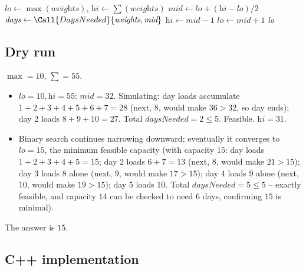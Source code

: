 \begin{algorithm}[H]
\caption{Minimum Capacity to Ship within D Days}
\begin{algorithmic}[1]
  \State $\textit{lo} \gets \max(\textit{weights})$, $\textit{hi} \gets \sum(\textit{weights})$
    \State $\textit{mid} \gets \textit{lo}+(\textit{hi}-\textit{lo})/2$
    \State $\textit{days} \gets \Call{DaysNeeded}{\textit{weights}, \textit{mid}}$
      \State $\textit{hi} \gets \textit{mid} - 1$
    \Else
      \State $\textit{lo} \gets \textit{mid} + 1$
    \EndIf
  \EndWhile
  \State \Return \textit{lo}
\EndProcedure
\end{algorithmic}
\end{algorithm}

\subsection*{Dry run}


$\max = 10$, $\sum = 55$.

\begin{itemize}
  \item $\textit{lo}=10,\textit{hi}=55$: $\textit{mid}=32$. Simulating: day
        loads accumulate $1{+}2{+}3{+}4{+}5{+}6{+}7=28$ (next, $8$, would
        make $36>32$, so day ends); day 2 loads $8{+}9{+}10=27$. Total
        $\textit{daysNeeded}=2 \le 5$. Feasible. $\textit{hi}=31$.
  \item Binary search continues narrowing downward; eventually it
        converges to $\textit{lo}=15$, the minimum feasible capacity (with
        capacity $15$: day loads $1{+}2{+}3{+}4{+}5=15$; day 2 loads
        $6{+}7=13$ (next, $8$, would make $21>15$); day 3 loads $8$ alone
        (next, $9$, would make $17>15$); day 4 loads $9$ alone (next,
        $10$, would make $19>15$); day 5 loads $10$. Total
        $\textit{daysNeeded}=5 \le 5$ -- exactly feasible, and capacity
        $14$ can be checked to need $6$ days, confirming $15$ is minimal).
\end{itemize}

The answer is $15$.

\subsection*{C++ implementation}

